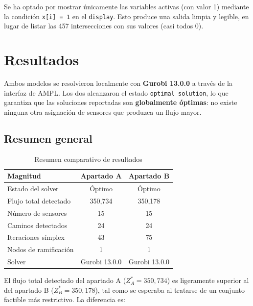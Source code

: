 \documentclass[12pt,a4paper]{article}
\begin{document}
Se ha optado por mostrar únicamente las variables activas (con valor 1) mediante la condición \texttt{x[i] = 1} en el \texttt{display}. Esto produce una salida limpia y legible, en lugar de listar las 457 intersecciones con sus valores (casi todos 0).

\section{Resultados}

Ambos modelos se resolvieron localmente con \textbf{Gurobi 13.0.0} a través de la interfaz de AMPL. Los dos alcanzaron el estado \texttt{optimal solution}, lo que garantiza que las soluciones reportadas son \textbf{globalmente óptimas}: no existe ninguna otra asignación de sensores que produzca un flujo mayor.

\subsection{Resumen general}

\begin{table}[H]
\centering
\caption{Resumen comparativo de resultados}
\begin{tabular}{>{\raggedright\arraybackslash}p{5cm}cc}
\toprule
\textbf{Magnitud} & \textbf{Apartado A} & \textbf{Apartado B} \\
\midrule
Estado del solver          & Óptimo             & Óptimo \\
Flujo total detectado      & 350,734            & 350,178 \\
Número de sensores         & 15                 & 15 \\
Caminos detectados         & 24                 & 24 \\
Iteraciones símplex        & 43                 & 75 \\
Nodos de ramificación      & 1                  & 1 \\
Solver                     & Gurobi 13.0.0      & Gurobi 13.0.0 \\
\bottomrule
\end{tabular}
\end{table}

El flujo total detectado del apartado A ($Z^*_A = 350{,}734$) es ligeramente superior al del apartado B ($Z^*_B = 350{,}178$), tal como se esperaba al tratarse de un conjunto factible más restrictivo. La diferencia es:
\end{document}
